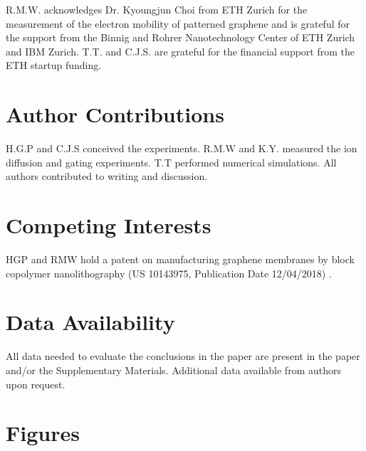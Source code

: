 \documentclass[journal=langd5,email=true, hyperref=true, keywords=false]{achemso}
\begin{document}
\begin{acknowledgement}
  R.M.W. acknowledges Dr. Kyoungjun Choi from ETH Zurich for the measurement of the electron mobility 
  of patterned graphene and is grateful for the support from the Binnig and Rohrer
  Nanotechnology Center of ETH Zurich and IBM Zurich. T.T. and
  C.J.S. are grateful for the financial support from the ETH startup
  funding. 
\end{acknowledgement}

\section*{Author Contributions}
\label{sec:author}

H.G.P and C.J.S conceived the experiments. R.M.W and K.Y. measured the ion
diffusion and gating experiments. T.T performed numerical
simulations. All authors contributed to writing and discussion.

\section*{Competing Interests}
{ HGP and RMW hold a patent on manufacturing graphene membranes by block copolymer nanolithography (US 10143975, Publication Date 12/04/2018) .}
 
\section*{Data Availability}
All data needed to evaluate the conclusions in the paper are present in the paper and/or the Supplementary Materials. Additional data available from authors upon request.

\section*{}




% 

\clearpage
\section*{Figures}
\label{sec:figs}
\end{document}
